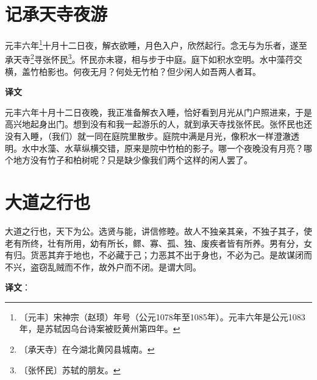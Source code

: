 \documentclass[12pt,UTF-8,openany,a4]{ctexbook}
\begin{document}
\chapter{记承天寺夜游}

\begin{large}
    
    元丰六年\footnote{〔元丰〕\yiwen 宋神宗（赵顼）年号（公元1078年至1085年）。元丰六年是公元1083年，是苏轼因乌台诗案被贬黄州第四年。}十月十二日夜，解衣欲睡，月色入户，欣然起行。念无与为乐者，遂至承天寺\footnote{〔承天寺〕\yiwen 在今湖北黄冈县城南。}寻张怀民\footnote{〔张怀民〕\yiwen 苏轼的朋友。}。怀民亦未寝，相与步于中庭。庭下如积水空明。水中藻荇交横，盖竹柏影也。何夜无月？何处无竹柏？但少闲人如吾两人者耳。

\end{large}


\newpage

\begin{Large}
    \noindent\textbf{译文}
\end{Large}


\vspace{1em}

\begin{large}
    \yiwen 
    元丰六年十月十二日夜晚，我正准备解衣入睡，恰好看到月光从门户照进来，于是高兴地起身出门。想到没有和我一起游乐的人，就到承天寺找张怀民。张怀民也还没有入睡，（我们）就一同在庭院里散步。庭院中满是月光，像积水一样澄澈透明。水中水藻、水草纵横交错，原来是院中竹柏的影子。哪一个夜晚没有月亮？哪个地方没有竹子和柏树呢？只是缺少像我们两个这样的闲人罢了。
    
\end{large}


\chapter{大道之行也}

\begin{large}
    
    大道之行也，天下为公。选贤与能，讲信修睦。故人不独亲其亲，不独子其子，使老有所终，壮有所用，幼有所长，鳏、寡、孤、独、废疾者皆有所养。男有分，女有归。货恶其弃于地也，不必藏于己；力恶其不出于身也，不必为己。是故谋闭而不兴，盗窃乱贼而不作，故外户而不闭。是谓大同。

\end{large}


\newpage

\begin{Large}
   \noindent \textbf{译文}：
\end{Large}
\end{document}
